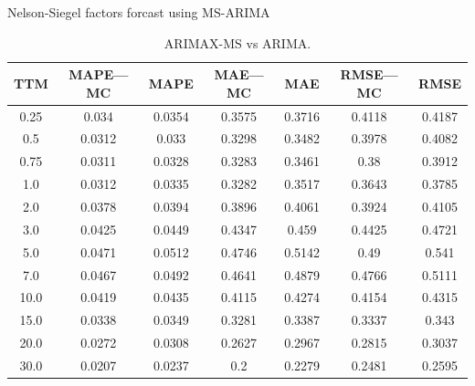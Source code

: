 \documentclass[aspectratio=169]{beamer}
\begin{document}
    \begin{frame}{Nelson-Siegel factors forcast using MS-ARIMA}
        \begin{table}[H]
            \begin{center}
                \begin{tabular}{|c|c|c|c|c|c|c|}
                    \hline
                    TTM    & MAPE---MC  & MAPE      & MAE---MC    & MAE       & RMSE---MC    & RMSE  \\ \hline
                    0.25   &0.034       & 0.0354    & 0.3575      & 0.3716    &0.4118        &0.4187 \\ \hline
                    0.5    &0.0312      & 0.033     & 0.3298      & 0.3482    &0.3978        &0.4082 \\ \hline
                    0.75   &0.0311      & 0.0328    & 0.3283      & 0.3461    &0.38          &0.3912   \\ \hline
                    1.0    &0.0312      & 0.0335    & 0.3282      & 0.3517    &0.3643        &0.3785 \\ \hline
                    2.0    &0.0378      & 0.0394    & 0.3896      & 0.4061    &0.3924        &0.4105 \\ \hline
                    3.0    &0.0425      & 0.0449    & 0.4347      & 0.459     &0.4425        &0.4721 \\ \hline
                    5.0    &0.0471      & 0.0512    & 0.4746      & 0.5142    &0.49          &0.541   \\ \hline
                    7.0    &0.0467      & 0.0492    & 0.4641      & 0.4879    &0.4766        &0.5111 \\ \hline
                    10.0   &0.0419      & 0.0435    & 0.4115      & 0.4274    &0.4154        &0.4315 \\ \hline
                    15.0   &0.0338      & 0.0349    & 0.3281      & 0.3387    &0.3337        &0.343 \\ \hline
                    20.0   &0.0272      & 0.0308    & 0.2627      & 0.2967    &0.2815        &0.3037 \\ \hline
                    30.0   &0.0207      & 0.0237    & 0.2         & 0.2279    &0.2481        &0.2595 \\ \hline
                \end{tabular}
                \caption{ARIMAX-MS vs ARIMA.}
            \end{center}
        \end{table} 
    \end{frame}
\end{document}
